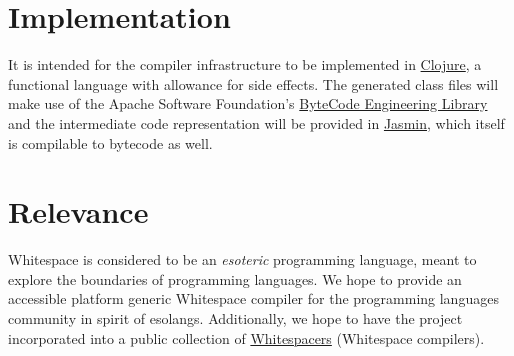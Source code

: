 \documentclass[10pt,letter]{article}
\begin{document}
	\section{Implementation}
		It is intended for the compiler infrastructure to be implemented in \href{https://clojure.org/index}{Clojure}, a functional language with allowance for side effects. The generated class files will make use of the Apache Software Foundation's \href{https://commons.apache.org/proper/commons-bcel/index.html}{ByteCode Engineering Library} and the intermediate code representation will be provided in \href{http://jasmin.sourceforge.net/}{Jasmin}, which itself is compilable to bytecode as well.
	\section{Relevance}
		Whitespace is considered to be an \textit{esoteric} programming language, meant to explore the boundaries of programming languages. We hope to provide an accessible platform generic Whitespace compiler for the programming languages community in spirit of esolangs. Additionally, we hope to have the project incorporated into a public collection of \href{https://github.com/hostilefork/whitespacers/}{Whitespacers} (Whitespace compilers).
\end{document}
